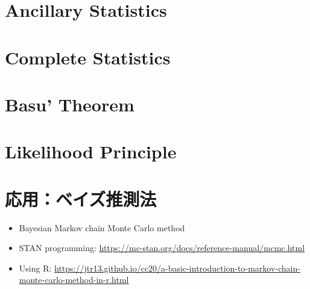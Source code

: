 \documentclass[
]{book}
\providecommand{\tightlist}{%
  \setlength{\itemsep}{0pt}\setlength{\parskip}{0pt}}
\begin{document}
\section{Ancillary Statistics}\label{ancillary-statistics}

\section{Complete Statistics}\label{complete-statistics}

\section{Basu' Theorem}\label{basu-theorem}

\section{Likelihood Principle}\label{likelihood-principle}

\section*{応用：ベイズ推測法}\label{ux5fdcux7528ux30d9ux30a4ux30baux63a8ux6e2cux6cd5-1}

\begin{itemize}
\tightlist
\item
  Bayesian Markov chain Monte Carlo method
\item
  STAN programming: \url{https://mc-stan.org/docs/reference-manual/mcmc.html}
\item
  Using R: \url{https://jtr13.github.io/cc20/a-basic-introduction-to-markov-chain-monte-carlo-method-in-r.html}
\end{itemize}
\end{document}
